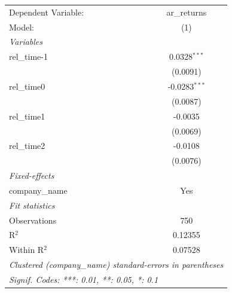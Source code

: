 
\begingroup
\centering
\begin{tabular}{lc}
   \tabularnewline \midrule \midrule
   Dependent Variable: & ar\_returns\\   
   Model:              & (1)\\  
   \midrule
   \emph{Variables}\\
   rel\_time-1         & 0.0328$^{***}$\\   
                       & (0.0091)\\   
   rel\_time0          & -0.0283$^{***}$\\   
                       & (0.0087)\\   
   rel\_time1          & -0.0035\\   
                       & (0.0069)\\   
   rel\_time2          & -0.0108\\   
                       & (0.0076)\\   
   \midrule
   \emph{Fixed-effects}\\
   company\_name       & Yes\\  
   \midrule
   \emph{Fit statistics}\\
   Observations        & 750\\  
   R$^2$               & 0.12355\\  
   Within R$^2$        & 0.07528\\  
   \midrule \midrule
   \multicolumn{2}{l}{\emph{Clustered (company\_name) standard-errors in parentheses}}\\
   \multicolumn{2}{l}{\emph{Signif. Codes: ***: 0.01, **: 0.05, *: 0.1}}\\
\end{tabular}
\par\endgroup


